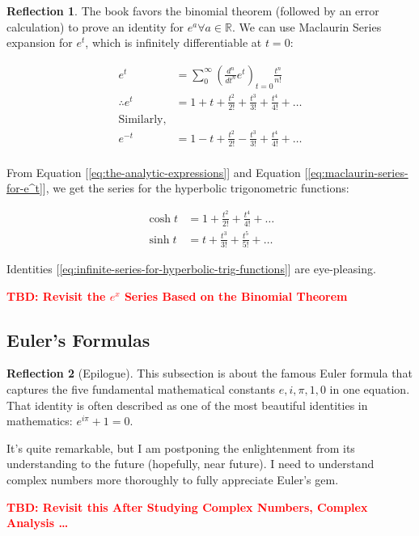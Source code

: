 \documentclass[11pt]{article}
\theoremstyle{definition}
\theoremstyle{plain}
\theoremstyle{problemstyle}
\theoremstyle{remark}
\theoremstyle{definition}
\newtheorem{reflection}{Reflection}
\begin{document}
\begin{reflection}
    The book favors the binomial theorem (followed by an error calculation) to prove an identity for $e^a \forall a\in\mathbb{R}$. We can use Maclaurin Series expansion for $e^t$, which is infinitely differentiable at $t=0$: 

    \begin{equation}
    \label{eq:maclaurin-series-for-e^t}
        \begin{aligned}
            e^t&=\sum_0^\infty (\frac{d^n}{dt^n} e^t)_{\scriptscriptstyle t=0}\frac{t^n}{n!}\\
            \therefore e^t&=1+t+\frac{t^2}{2!}+\frac{t^3}{3!}+\frac{t^4}{4!}+\dots\\
               \text{Similarly,}\\
                      e^{-t}&=1-t+\frac{t^2}{2!}-\frac{t^3}{3!}+\frac{t^4}{4!}+\dots\\
        \end{aligned}
    \end{equation}

From Equation [\ref{eq:the-analytic-expressions}] and Equation [\ref{eq:maclaurin-series-for-e^t}], we get the series for the hyperbolic trigonometric functions:

    \begin{equation}
    \label{eq:infinite-series-for-hyperbolic-trig-functions}
        \begin{aligned}
            \cosh{t}&=1+\frac{t^2}{2!}+\frac{t^4}{4!}+\dots\\
            \sinh{t}&=t+\frac{t^3}{3!}+\frac{t^5}{5!}+\dots
        \end{aligned}
    \end{equation}

    Identities [\ref{eq:infinite-series-for-hyperbolic-trig-functions}] are eye-pleasing.

\end{reflection}




\textcolor{red}{\textbf{TBD: Revisit the $e^x$ Series Based on the Binomial Theorem}} 


\subsection{Euler's Formulas}

\begin{reflection}[Epilogue]
    This subsection is about the famous Euler formula that captures the five fundamental mathematical constants $e,i,\pi,1,0$ in one equation. That identity is often described as one of the most beautiful identities in mathematics: $e^{i\pi}+1=0$.

    It's quite remarkable, but I am postponing the enlightenment from its understanding to the future (hopefully, near future). I need to understand complex numbers more thoroughly to fully appreciate Euler's gem.
\end{reflection}
\textcolor{red}{\textbf{TBD: Revisit this After Studying Complex Numbers, Complex Analysis \dots}} 
\end{document}
